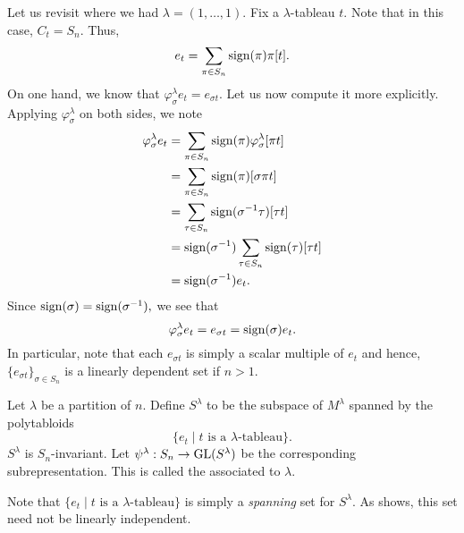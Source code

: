 \begin{ex} \label{ex:alttabloidrep2}
	Let us revisit  where we had $\lambda = (1, \ldots, 1).$ Fix a $\lambda$-tableau $t.$ Note that in this case, $C_t = S_n.$ Thus,
	\begin{equation*} 
		e_t = \sum_{\pi \in S_n} \operatorname{sign}(\pi)\pi[t].
	\end{equation*}
	On one hand, we know that $\varphi^\lambda_\sigma e_t = e_{\sigma t}.$ Let us now compute it more explicitly. Applying $\varphi^\lambda_\sigma$ on both sides, we note
	\begin{align*} 
		\varphi^\lambda_\sigma e_t &= \sum_{\pi \in S_n} \operatorname{sign}(\pi)\varphi^\lambda_\sigma[\pi t]\\
		&= \sum_{\pi \in S_n} \operatorname{sign}(\pi)[\sigma\pi t]\\
		&= \sum_{\tau \in S_n} \operatorname{sign}(\sigma^{-1}\tau)[\tau t]\\
		&= \operatorname{sign}(\sigma^{-1})\sum_{\tau \in S_n} \operatorname{sign}(\tau)[\tau t]\\
		&= \operatorname{sign}(\sigma^{-1})e_t.
	\end{align*}
	Since $\operatorname{sign}(\sigma) = \operatorname{sign}(\sigma^{-1}),$ we see that
	\begin{equation*} 
		\varphi^\lambda_\sigma e_t = e_{\sigma t} = \operatorname{sign}(\sigma) e_t.
	\end{equation*}
	In particular, note that each $e_{\sigma t}$ is simply a scalar multiple of $e_t$ and hence, $\{e_{\sigma t}\}_{\sigma \in S_n}$ is a linearly dependent set if $n > 1.$
\end{ex}

\begin{defn}%
	\label{defn:sprechtrepresentation}
	Let $\lambda$ be a partition of $n.$ Define $S^\lambda$ to be the subspace of $M^\lambda$ spanned by the polytabloids
	\begin{equation*} 
		\{e_t \mid t \text{ is a } \lambda\text{-tableau}\}.
	\end{equation*}
	$S^\lambda$ is $S_n$-invariant. Let $\psi^\lambda : S_n \to \operatorname{GL}(S^\lambda)$ be the corresponding subrepresentation. This is called the  associated to $\lambda.$
\end{defn}

\begin{rem}
	Note that $\{e_t \mid t \text{ is a } \lambda\text{-tableau}\}$ is simply a \emph{spanning} set for $S^\lambda.$ As  shows, this set need not be linearly independent.
\end{rem}

